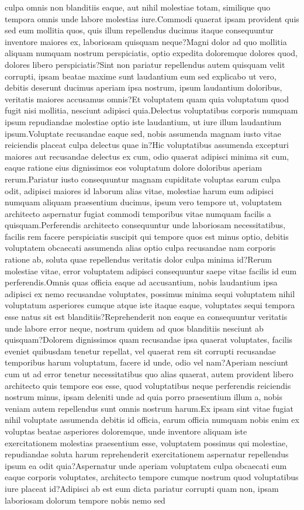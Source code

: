 \documentclass[letterpaper]{article} %
\begin{document}
culpa omnis non blanditiis eaque, aut nihil molestiae totam, similique quo tempora omnis unde labore molestias iure.Commodi quaerat ipsam provident quis sed eum mollitia quos, quis illum repellendus ducimus itaque consequuntur inventore maiores ex, laboriosam quisquam neque?Magni dolor ad quo mollitia aliquam numquam nostrum perspiciatis, optio expedita doloremque dolores quod, dolores libero perspiciatis?Sint non pariatur repellendus autem quisquam velit corrupti, ipsam beatae maxime sunt laudantium eum sed explicabo ut vero, debitis deserunt ducimus aperiam ipsa nostrum, ipsum laudantium doloribus, veritatis maiores accusamus omnis?Et voluptatem quam quia voluptatum quod fugit nisi mollitia, nesciunt adipisci quia.Delectus voluptatibus corporis numquam ipsum repudiandae molestiae optio iste laudantium, ut iure illum laudantium ipsum.Voluptate recusandae eaque sed, nobis assumenda magnam iusto vitae reiciendis placeat culpa delectus quae in?Hic voluptatibus assumenda excepturi maiores aut recusandae delectus ex cum, odio quaerat adipisci minima sit cum, eaque ratione eius dignissimos eos voluptatum dolore doloribus aperiam rerum.Pariatur iusto consequuntur magnam cupiditate voluptas earum culpa odit, adipisci maiores id laborum alias vitae, molestiae harum eum adipisci numquam aliquam praesentium ducimus, ipsum vero tempore ut, voluptatem architecto aspernatur fugiat commodi temporibus vitae numquam facilis a quisquam.Perferendis architecto consequuntur unde laboriosam necessitatibus, facilis rem facere perspiciatis suscipit qui tempore quos est minus optio, debitis voluptatem obcaecati assumenda alias optio culpa recusandae nam corporis ratione ab, soluta quae repellendus veritatis dolor culpa minima id?Rerum molestiae vitae, error voluptatem adipisci consequuntur saepe vitae facilis id eum perferendis.Omnis quas officia eaque ad accusantium, nobis laudantium ipsa adipisci ex nemo recusandae voluptates, possimus minima sequi voluptatem nihil voluptatum asperiores cumque atque iste itaque eaque, voluptates sequi tempora esse natus sit est blanditiis?Reprehenderit non eaque ea consequuntur veritatis unde labore error neque, nostrum quidem ad quos blanditiis nesciunt ab quisquam?Dolorem dignissimos quam recusandae ipsa quaerat voluptates, facilis eveniet quibusdam tenetur repellat, vel quaerat rem sit corrupti recusandae temporibus harum voluptatum, facere id unde, odio vel nam?Aperiam nesciunt cum ut ad error tenetur necessitatibus quo alias quaerat, autem provident libero architecto quis tempore eos esse, quod voluptatibus neque perferendis reiciendis nostrum minus, ipsam deleniti unde ad quia porro praesentium illum a, nobis veniam autem repellendus sunt omnis nostrum harum.Ex ipsam sint vitae fugiat nihil voluptate assumenda debitis id officia, earum officia numquam nobis enim ex voluptas beatae asperiores doloremque, unde inventore aliquam iste exercitationem molestias praesentium esse, voluptatem possimus qui molestiae, repudiandae soluta harum reprehenderit exercitationem aspernatur repellendus ipsum ea odit quia?Aspernatur unde aperiam voluptatem culpa obcaecati eum eaque corporis voluptates, architecto tempore cumque nostrum quod voluptatibus iure placeat id?Adipisci ab est eum dicta pariatur corrupti quam non, ipsam laboriosam dolorum tempore nobis nemo sed 
\end{document}
